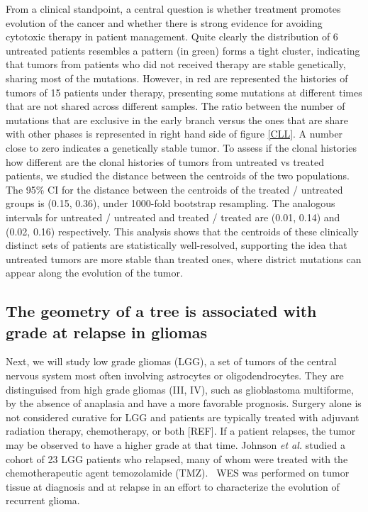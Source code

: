 \documentclass[a4paper,11pt]{article}
\begin{document}
From a clinical standpoint, a central question is whether treatment promotes evolution of the cancer and whether there is strong evidence for avoiding cytotoxic therapy in patient management.
Quite clearly the distribution of 6 untreated patients resembles a pattern (in green) forms a tight cluster, indicating that tumors from patients who did not received therapy are stable genetically, sharing most of the mutations. However, in red are represented the histories of tumors of 15 patients under therapy, presenting some mutations at different times that are not shared across different samples. The ratio between the number of mutations that are exclusive in the early branch versus the ones that are share with other phases is represented in right hand side of figure \ref{CLL}. A number close to zero indicates a genetically stable tumor. To assess if the clonal histories how different are the clonal histories of tumors from untreated vs treated patients, we studied the distance between the centroids of the two populations. The 95\% CI for the distance between the centroids of the treated / untreated groups is (0.15, 0.36), under 1000-fold bootstrap resampling. The analogous intervals for untreated / untreated and treated / treated are (0.01, 0.14) and (0.02, 0.16) respectively.
This analysis shows that the centroids of these clinically distinct sets of patients are statistically well-resolved, supporting the idea that untreated tumors are more stable than treated ones, where district mutations can appear along the evolution of the tumor.

\subsection{The geometry of a tree is associated with grade at relapse in gliomas}

Next, we will study low grade gliomas (LGG), a set of tumors of the central nervous system most often involving astrocytes or oligodendrocytes.
They are distinguised from high grade gliomas (III, IV), such as glioblastoma multiforme, by the absence of anaplasia and have a more favorable prognosis.
Surgery alone is not considered curative for LGG and patients are typically treated with adjuvant radiation therapy, chemotherapy, or both [REF].
If a patient relapses, the tumor may be observed to have a higher grade at that time.
Johnson \textit{et al.} studied a cohort of 23 LGG patients who relapsed, many of whom were treated with the chemotherapeutic agent temozolamide (TMZ).~\cite{johnson2014mutational}
WES was performed on tumor tissue at diagnosis and at relapse in an effort to characterize the evolution of recurrent glioma.
\end{document}
